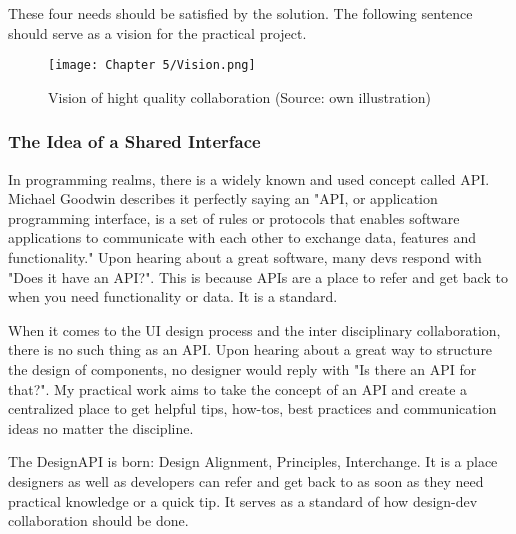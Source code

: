 These four needs should be satisfied by the solution. The following sentence should serve as a
vision for the practical project.

\begin{figure}[H]
      \centering
      \texttt{[image: Chapter 5/Vision.png]}
      \caption{Vision of hight quality collaboration (Source: own illustration)}
\end{figure}

\subsubsection{The Idea of a Shared Interface}


In programming realms, there is a widely known and used concept called API. Michael Goodwin
describes it perfectly saying an "API, or application programming interface, is a set of rules or
protocols that enables software applications to communicate with each other to exchange data,
features and functionality."  Upon hearing about a
great software, many devs respond with "Does it have an API?". This is because APIs are a place to
refer and get back to when you need functionality or data. It is a standard.

When it comes to the UI design process and the inter disciplinary collaboration, there is no such
thing as an API. Upon hearing about a great way to structure the design of components, no designer
would reply with "Is there an API for that?". My practical work aims to take the concept of an API
and create a centralized place to get helpful tips, how-tos, best practices and communication ideas
no matter the discipline.

The DesignAPI is born: Design Alignment, Principles, Interchange. It is a place designers as well as
developers can refer and get back to as soon as they need practical knowledge or a quick tip. It
serves as a standard of how design-dev collaboration should be done.

